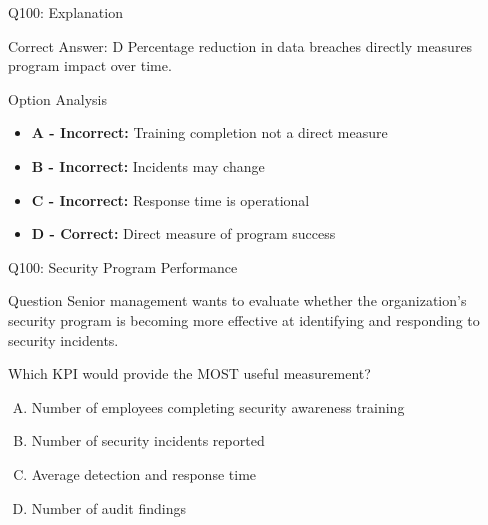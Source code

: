 \documentclass{beamer}
\begin{document}
	\begin{frame}{Q100: Explanation}
		\begin{block}{Correct Answer: D}
			Percentage reduction in data breaches directly measures program impact over time.
		\end{block}
		\begin{block}{Option Analysis}
			\begin{itemize}
				\item \textbf{A - Incorrect:} Training completion not a direct measure
				\item \textbf{B - Incorrect:} Incidents may change
				\item \textbf{C - Incorrect:} Response time is operational
				\item \textbf{D - Correct:} Direct measure of program success
			\end{itemize}
		\end{block}
	\end{frame}
	
	
	\begin{frame}[shrink=10]{Q100: Security Program Performance}
		\begin{block}{Question}
			Senior management wants to evaluate whether the organization's
			security program is becoming more effective at identifying and
			responding to security incidents.
			
			Which KPI would provide the MOST useful measurement?
		\end{block}
		
		\begin{enumerate}[(A)]
			\item Number of employees completing security awareness training
			\item Number of security incidents reported
			\item Average detection and response time
			\item Number of audit findings
		\end{enumerate}
	\end{frame}
	
\end{document}
